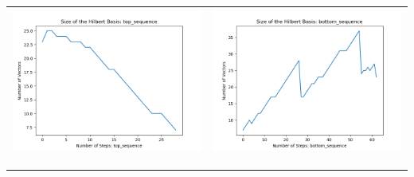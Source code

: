 \documentclass[10pt]{article}
\begin{document}
\begin{tabular}{c|c}
\begin{minipage}{.45\textwidth}
\includegraphics[width=\textwidth]{"DATA/4d/5 generators 2 bound F/top_sequence SIZE"}
\end{minipage} &
\begin{minipage}{.45\textwidth}
\includegraphics[width=\textwidth]{"DATA/4d/5 generators 2 bound F bottomup/bottom_sequence SIZE"}
\end{minipage} \\ \\
\hline \\\begin{minipage}{.45\textwidth}

\end{minipage}
\end{tabular}
\end{document}
